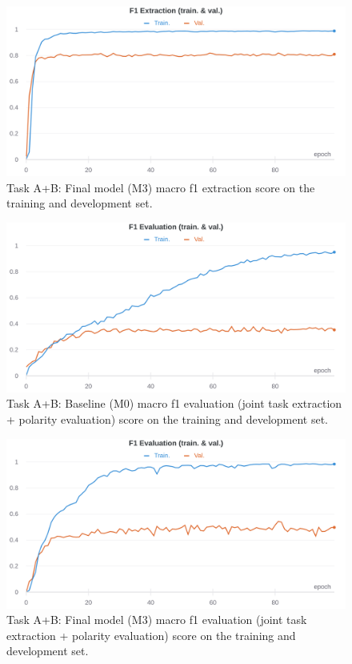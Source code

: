\documentclass[11pt,a4paper]{article}
\begin{document}
	\begin{figure}[H]
		\centering
		\includegraphics[width=1\columnwidth]{M3_ab_f1_extr.png}
		\caption{Task A+B: Final model (M3) macro f1 extraction score on the training
			and development set.}
		\label{fig:M3_extr}
	\end{figure}
	
	\begin{figure}[H]
		\centering
		\includegraphics[width=1\columnwidth]{M0_ab_f1_eval.png}
		\caption{Task A+B: Baseline (M0) macro f1 evaluation (joint task extraction + polarity evaluation) score on the training and development set.}
		\label{fig:M0_eval}
	\end{figure}
	
	\begin{figure}[H]
		\centering
		\includegraphics[width=1\columnwidth]{M3_ab_f1_eval.png}
		\caption{Task A+B: Final model (M3) macro f1 evaluation (joint task extraction + polarity evaluation) score on the training and development set.}
		\label{fig:M3_eval}
	\end{figure}
	
\end{document}
